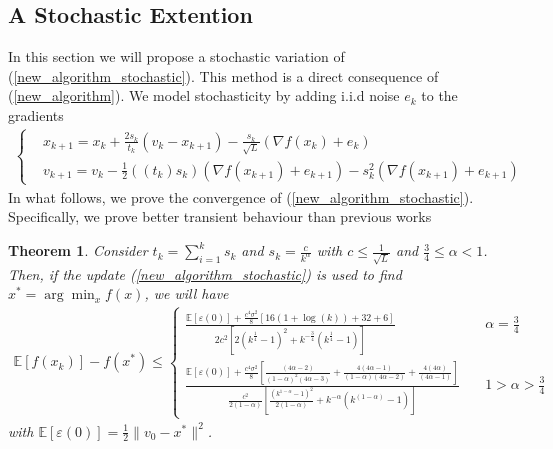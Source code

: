 \documentclass{article}
\theoremstyle{plain}
\newtheorem{thm}{\textbf{Theorem}}
\theoremstyle{definition}
\theoremstyle{remark}
\begin{document}
\subsection{A Stochastic Extention}
In this section we will propose a stochastic variation of (\ref{new_algorithm_stochastic}). This method is a direct consequence of (\ref{new_algorithm}). We model stochasticity by adding i.i.d noise $e_k$ to the gradients 
\begin{align}\label{new_algorithm_stochastic}
   \left\{ \begin{array}{ll}
    &x_{k+1}   =    x_{k} + \frac{2s_k}{t_k}(v_k-x_{k+1})-\frac{s_k}{\sqrt{L}}(\nabla f(x_k)+e_k)\\
     &v_{k+1}    = v_k -\tfrac{1}{2}((t_k)s_k)(\nabla f(x_{k+1})+e_{k+1})-s_k^2(\nabla f(x_{k+1})+e_{k+1}) 
    \end{array}\right.
\end{align}
In what follows, we prove the convergence of (\ref{new_algorithm_stochastic}). Specifically, we prove better transient behaviour than previous works \cite{pmlr-v108-laborde20a,}
\begin{thm}\label{Theorem5}
    Consider $t_k=\sum_{i=1}^k s_k $ and $s_k=\frac{c}{k^{\alpha}}$ with $c\leq \frac{1}{\sqrt{L}}$ and $\frac{3}{4}\leq\alpha<1$. Then, if the update (\ref{new_algorithm_stochastic}) is used to find $x^*=\arg\min_x f(x)$, we will have
    \begin{align}
    \mathbb E[f(x_k)]-f(x^*)\leq \left\{\begin{array}{lr}
         \frac{\mathbb E[\varepsilon (0)]+\frac{c^4\sigma^2}{8}\left[16(1+\log(k))+32+6\right]}{2c^2\left[2(k^{\frac{1}{4}}-1)^2+k^{-\frac{3}{4}}(k^{\frac{1}{4}}-1)\right]} & \quad \alpha=\frac{3}{4} \\
          \frac{\mathbb E[\varepsilon (0)]+\frac{c^4\sigma^2}{8}\left[\frac{(4\alpha -2)}{(1-\alpha)^2(4\alpha-3)}+\frac{4(4\alpha -1)}{(1-\alpha)(4\alpha -2)}+\frac{4(4\alpha )}{(4\alpha -1)}\right]}{\frac{c^2}{2(1-\alpha)}\left[\frac{(k^{1-\alpha}-1)^2}{2(1-\alpha)}+k^{-\alpha}(k^{(1-\alpha)}-1)\right]}& \quad 1>\alpha>\frac{3}{4}
    \end{array}\right.\nonumber
\end{align}
with $\mathbb E[\varepsilon (0)]=\frac{1}{2}\|v_0-x^*\|^2$.
\end{thm}
\end{document}
